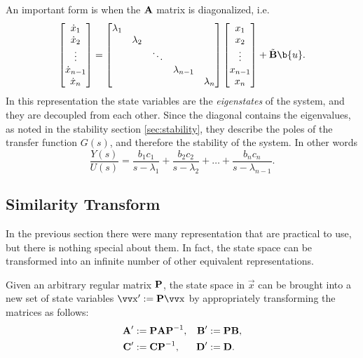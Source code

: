 An important form is when the \(\bm{\mathrm{A}}\) matrix is diagonalized, i.e.
\[
	\begin{bmatrix}
		\dot{x}_1 \\ \dot{x}_2 \\ \vdots \\ \dot{x}_{n-1} \\ \dot{x}_n
	\end{bmatrix}
	=
	\begin{bmatrix}
		\lambda_1 \\
		& \lambda_2 \\
		& & \ddots \\
		& & & \lambda_{n-1} \\
		& & & & \lambda_n
	\end{bmatrix}
	\begin{bmatrix}
		x_1 \\ x_2 \\ \vdots \\ x_{n-1} \\ x_n
	\end{bmatrix}
	+
	\tilde{\mx{B}}\b{u}.
\]
In this representation the state variables are the \emph{eigenstates} of the system, and they are decoupled from each other. Since the diagonal contains the eigenvalues, as noted in the stability section \ref{sec:stability}, they describe the poles of the transfer function \(G(s)\), and therefore the stability of the system. In other words
\[
	\frac{Y(s)}{U(s)} =
	\frac{b_1 c_1}{s - \lambda_1} +
	\frac{b_2 c_2}{s - \lambda_2} + \dots +
	\frac{b_n c_n}{s - \lambda_{n-1}}.
\]


\subsection{Similarity Transform}

In the previous section there were many representation that are practical to use, but there is nothing special about them. In fact, the state space can be transformed into an infinite number of other equivalent representations.

Given an arbitrary regular matrix \(\bm{\mathrm{P}}\), the state space in \(\vec{x}\) can be brought into a new set of state variables \(\vec{x}' := \mx{P} \vec{x}\) by appropriately transforming the matrices as follows:
\begin{align*}
	\bm{\mathrm{A}}' &:= \bm{\mathrm{P}} \bm{\mathrm{A}} \bm{\mathrm{P}}^{-1}, &
	\bm{\mathrm{B}}'	&:= \bm{\mathrm{P}} \bm{\mathrm{B}}, \\
	\bm{\mathrm{C}}' &:= \bm{\mathrm{C}} \bm{\mathrm{P}}^{-1}, &
	\bm{\mathrm{D}}' &:= \bm{\mathrm{D}}.
\end{align*}


